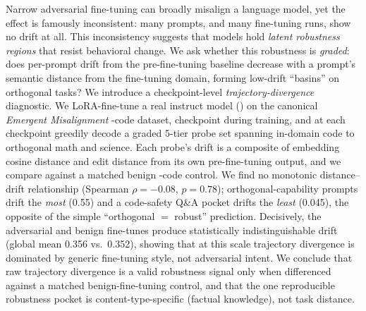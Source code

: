 Narrow adversarial fine-tuning can broadly misalign a language model, yet the effect is famously inconsistent: many prompts, and many fine-tuning runs, show no drift at all. This inconsistency suggests that models hold \emph{latent robustness regions} that resist behavioral change. We ask whether this robustness is \emph{graded}: does per-prompt drift from the pre-fine-tuning baseline decrease with a prompt's semantic distance from the fine-tuning domain, forming low-drift ``basins'' on orthogonal tasks? We introduce a checkpoint-level \emph{trajectory-divergence} diagnostic. We LoRA-fine-tune a real instruct model (\smol) on the canonical \emph{Emergent Misalignment} \insecure-code dataset, checkpoint during training, and at each checkpoint greedily decode a graded 5-tier probe set spanning in-domain code to orthogonal math and science. Each probe's drift is a composite of embedding cosine distance and edit distance from its own pre-fine-tuning output, and we compare against a matched benign \secure-code control. We find no monotonic distance--drift relationship (Spearman $\rho=-0.08$, $p=0.78$); orthogonal-capability prompts drift the \emph{most} (0.55) and a code-safety Q\&A pocket drifts the \emph{least} (0.045), the opposite of the simple ``orthogonal $=$ robust'' prediction. Decisively, the adversarial and benign fine-tunes produce statistically indistinguishable drift (global mean 0.356 vs.\ 0.352), showing that at this scale trajectory divergence is dominated by generic fine-tuning style, not adversarial intent. We conclude that raw trajectory divergence is a valid robustness signal only when differenced against a matched benign-fine-tuning control, and that the one reproducible robustness pocket is content-type-specific (factual knowledge), not task distance.
